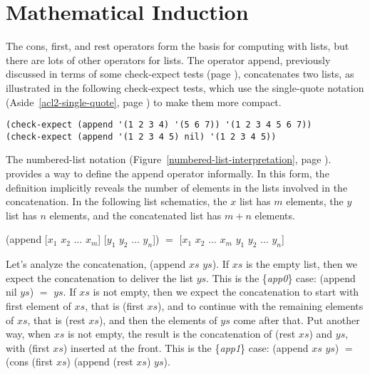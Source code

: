 \section{Mathematical Induction}
\label{sec:induction}
The \textsf{cons}, \textsf{first}, and \textsf{rest} operators
form the basis for computing with lists,
but there are lots of other operators for lists.
The operator \textsf{append}, previously discussed in terms of some \textsf{check-expect} tests
(page \pageref{append-op-informal}), concatenates two lists, as illustrated
in the following \textsf{check-expect} tests,
which use the single-quote notation (Aside~\ref{acl2-single-quote}, page \pageref{acl2-single-quote})
to make them more compact.

\begin{Verbatim}
(check-expect (append '(1 2 3 4) '(5 6 7)) '(1 2 3 4 5 6 7))
(check-expect (append '(1 2 3 4 5) nil) '(1 2 3 4 5))
\end{Verbatim}

The numbered-list notation
(Figure~\ref{numbered-list-interpretation}, page \pageref{numbered-list-interpretation}).
provides a way to define the \textsf{append} operator informally.
In this form, the definition implicitly reveals the number of elements in the lists
involved in the concatenation.
\label{list-schematic} In the following list schematics,
the $x$ list has $m$ elements, the $y$ list has $n$ elements,
and the concatenated list has $m+n$ elements.
\begin{samepage}
\begin{center}
\textsf{(append [$x_1$ $x_2$ $\dots$ $x_m$] [$y_1$ $y_2$ $\dots$ $y_n$])} $=$
\textsf{[$x_1$ $x_2$ $\dots$ $x_m$ $y_1$ $y_2$ $\dots$ $y_n$]}
\end{center}
\end{samepage}

Let's analyze the concatenation, \textsf{(append $xs$ $ys$)}.
If $xs$ is the empty list, then we expect
the concatenation to deliver the list $ys$.
This is the  \{\emph{app0}\} case: \textsf{(append nil $ys$)} $=$ $ys$.
If $xs$ is not empty, then we expect the concatenation
to start with first element of $xs$,
that is \textsf{(first $xs$)}, and to continue
with the remaining elements of $xs$, that is \textsf{(rest $xs$)},
and then the elements of $ys$ come after that.
Put another way, when $xs$ is not empty,
the result is the concatenation of \textsf{(rest $xs$)} and $ys$,
with \textsf{(first $xs$)} inserted at the front.
This is the \{\emph{app1}\} case: \textsf{(append $xs$ $ys$)} $=$
\textsf{(cons (first $xs$) (append (rest $xs$) $ys$)}.

